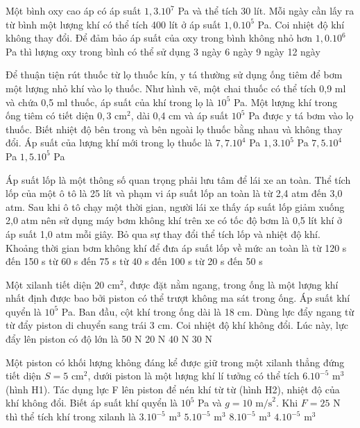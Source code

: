 \begin{ex}
Một bình oxy cao áp có áp suất $1,3.10^7$ Pa và thể tích 30 lít. Mỗi ngày cần lấy ra từ bình một lượng khí có thể tích 400 lít ở áp suất $1,0.10^5$ Pa. Coi nhiệt độ khí không thay đổi. Để đảm bảo áp suất của oxy trong bình không nhỏ hơn $1,0.10^6$ Pa thì lượng oxy trong bình có thể sử dụng
\choice
{3 ngày}
{6 ngày}
{9 ngày}
{12 ngày}
\end{ex}

\begin{ex}
Để thuận tiện rút thuốc từ lọ thuốc kín, y tá thường sử dụng ống tiêm để bơm một lượng nhỏ khí vào lọ thuốc. Như hình vẽ, một chai thuốc có thể tích 0,9 ml và chứa 0,5 ml thuốc, áp suất của khí trong lọ là $10^5$ Pa. Một lượng khí trong ống tiêm có tiết diện $0,3 \text{ cm}^2$, dài 0,4 cm và áp suất $10^5$ Pa được y tá bơm vào lọ thuốc. Biết nhiệt độ bên trong và bên ngoài lọ thuốc bằng nhau và không thay đổi. Áp suất của lượng khí mới trong lọ thuốc là
\choice
{$7,7.10^4$ Pa}
{$1,3.10^5$ Pa}
{$7,5.10^4$ Pa}
{$1,5.10^5$ Pa}
\end{ex}

\begin{ex}
Áp suất lốp là một thông số quan trọng phải lưu tâm để lái xe an toàn. Thể tích lốp của một ô tô là 25 lít và phạm vi áp suất lốp an toàn là từ 2,4 atm đến 3,0 atm. Sau khi ô tô chạy một thời gian, người lái xe thấy áp suất lốp giảm xuống 2,0 atm nên sử dụng máy bơm không khí trên xe có tốc độ bơm là 0,5 lít khí ở áp suất 1,0 atm mỗi giây. Bỏ qua sự thay đổi thể tích lốp và nhiệt độ khí. Khoảng thời gian bơm không khí để đưa áp suất lốp về mức an toàn là
\choice
{từ 120 s đến 150 s}
{từ 60 s đến 75 s}
{từ 40 s đến 100 s}
{từ 20 s đến 50 s}
\end{ex}

\begin{ex}
Một xilanh tiết diện $20 \text{ cm}^2$, được đặt nằm ngang, trong ống là một lượng khí nhất định được bao bởi piston có thể trượt không ma sát trong ống. Áp suất khí quyển là $10^5$ Pa. Ban đầu, cột khí trong ống dài là 18 cm. Dùng lực đẩy ngang từ từ đẩy piston di chuyển sang trái 3 cm. Coi nhiệt độ khí không đổi. Lúc này, lực đẩy lên piston có độ lớn là
\choice
{50 N}
{20 N}
{40 N}
{30 N}
\end{ex}

\begin{ex}
Một piston có khối lượng không đáng kể được giữ trong một xilanh thẳng đứng tiết diện $S = 5 \text{ cm}^2$, dưới piston là một lượng khí lí tưởng có thể tích $6.10^{-5} \text{ m}^3$ (hình H1). Tác dụng lực F lên piston để nén khí từ từ (hình H2), nhiệt độ của khí không đổi. Biết áp suất khí quyển là $10^5$ Pa và $g = 10 \text{ m/s}^2$. Khi $F = 25$ N thì thể tích khí trong xilanh là
\choice
{$3.10^{-5} \text{ m}^3$}
{$5.10^{-5} \text{ m}^3$}
{$8.10^{-5} \text{ m}^3$}
{$4.10^{-5} \text{ m}^3$}
\end{ex}

